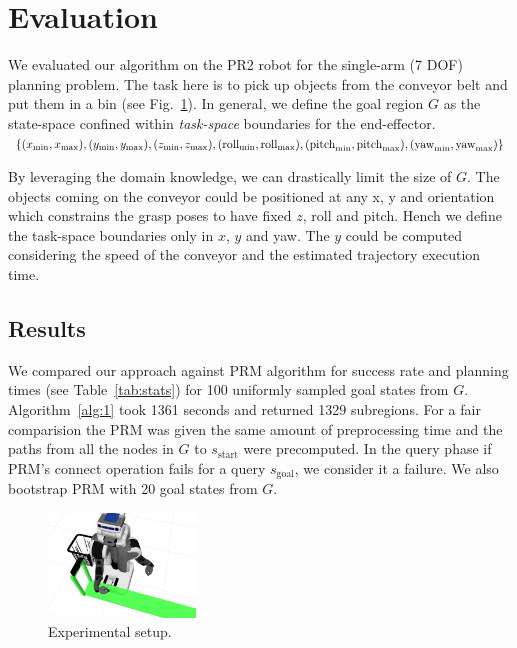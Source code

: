 \documentclass[letterpaper, 10 pt, conference]{ieeeconf}  %
\begin{document}
\section{Evaluation}
We evaluated our algorithm on the PR2 robot for the single-arm (7 DOF) planning problem. The task here is to pick up objects from the conveyor belt and put them in a bin (see Fig.~\ref{fig:sim}). In general, we define the goal region $G$ as the state-space confined within \textit{task-space} boundaries for the end-effector.\\
{$\{(x_{\text{min}}, x_{\text{max}}), (y_{\text{min}}, y_{\text{max}}), (z_{\text{min}}, z_{\text{max}}), (\text{roll}_{\text{min}}, \text{roll}_{\text{max}}),\\ (\text{pitch}_{\text{min}}, \text{pitch}_{\text{max}}), (\text{yaw}_{\text{min}}, \text{yaw}_{\text{max}})\}$}

By leveraging the domain knowledge, we can drastically limit the size of $G$. The objects coming on the conveyor could be positioned at any x, y and orientation which constrains the grasp poses to have fixed $z$, roll and pitch. Hench we define the task-space boundaries only in $x$, $y$ and yaw. The $y$ could be computed considering the speed of the conveyor and the estimated trajectory execution time.

\subsection{Results}
We compared our approach against \textsf{PRM} algorithm for success rate and planning times (see Table~\ref{tab:stats}) for 100 uniformly sampled goal states from $G$. Algorithm~\ref{alg:1} took 1361 seconds and returned 1329 subregions. For a fair comparision the \textsf{PRM} was given the same amount of preprocessing time and the paths from all the nodes in $G$ to $s_{\text{start}}$ were precomputed. In the query phase if \textsf{PRM}'s connect operation fails for a query $s_{\text{goal}}$, we consider it a failure. We also bootstrap \textsf{PRM} with 20 goal states from $G$. 

\begin{figure}[tb]
  \centering
    \includegraphics[width=0.35\textwidth]{simulation2.png}
  \caption{
  Experimental setup.
}
    \label{fig:sim}
 \vspace{-3mm}
\end{figure}
\end{document}
